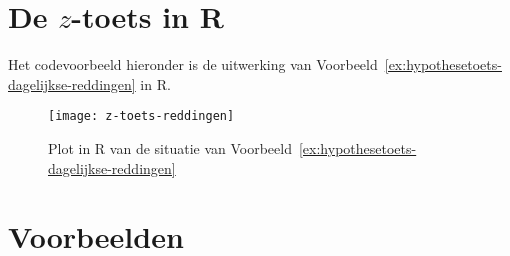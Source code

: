 \section{De \texorpdfstring{$z$}{z}-toets in R}
\label{sec:z-toets-R}

Het codevoorbeeld hieronder is de uitwerking van Voorbeeld~\ref{ex:hypothesetoets-dagelijkse-reddingen} in R.



\begin{figure}
  \centering
  \texttt{[image: z-toets-reddingen]}
  \caption{Plot in R van de situatie van Voorbeeld~\ref{ex:hypothesetoets-dagelijkse-reddingen}}
\end{figure}

\section{Voorbeelden}

